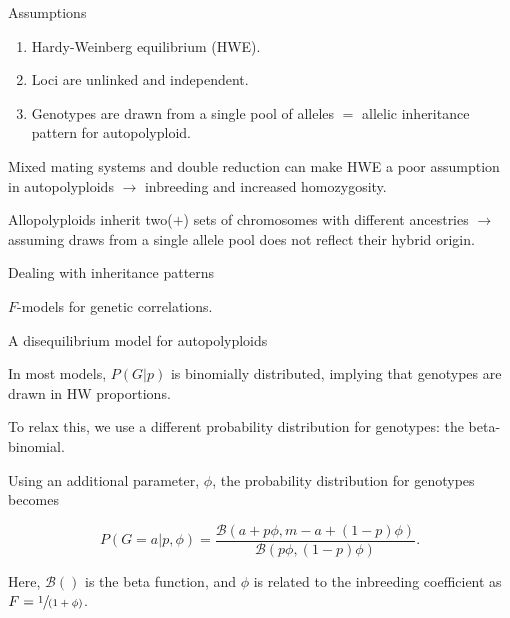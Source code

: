 \documentclass[presentation,sansserif]{beamer}
\begin{document}
\begin{frame}[t]{Assumptions}

  \begin{enumerate}
    \setlength\itemsep{0.25in}
    \item Hardy-Weinberg equilibrium (HWE).
    \item Loci are unlinked and independent.
    \item Genotypes are drawn from a single pool of alleles $=$ allelic inheritance pattern for autopolyploid.
  \end{enumerate}
  \vspace{0.25in}
  \pause

Mixed mating systems and double reduction can make HWE a poor assumption in autopolyploids \pause $\rightarrow$ inbreeding and increased homozygosity.
\vspace{0.25in}
\pause

Allopolyploids inherit two($+$) sets of chromosomes with different ancestries \pause $\rightarrow$ assuming draws from a single allele pool does not reflect their hybrid origin.

\end{frame}

\begin{frame}[t]{Dealing with inheritance patterns}

  $F$-models for genetic correlations.

\end{frame}

\begin{frame}[t]{A disequilibrium model for autopolyploids}

  In most models, $P(G|p)$ is binomially distributed, implying that genotypes are drawn in HW proportions.
  \vspace{0.3in}
  \pause
  
  To relax this, we use a different probability distribution for genotypes: the beta-binomial.
  \vspace{0.3in}
  \pause
  
  Using an additional parameter, $\phi$, the probability distribution for genotypes becomes
  \vspace{0.1in}
  
  \begin{equation}
    P(G=a|p,\phi) = \frac{\mathcal{B}(a + p\phi, m - a + (1-p)\phi)}{\mathcal{B}(p\phi, (1-p)\phi)}.
  \end{equation}
  \vspace{0.2in}
  \pause
  

Here, $\mathcal{B}()$ is the beta function, and $\phi$ is related to the inbreeding coefficient as $F = \sfrac{1}{(1+\phi)}$.

\end{frame}
\end{document}
